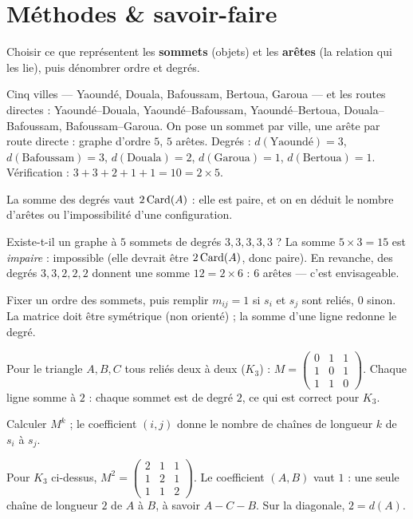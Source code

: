 \section{Méthodes \& savoir-faire}

Choisir ce que représentent les \textbf{sommets} (objets) et les \textbf{arêtes} (la relation
qui les lie), puis dénombrer ordre et degrés.
\begin{exemple}
Cinq villes — Yaoundé, Douala, Bafoussam, Bertoua, Garoua — et les routes directes :
Yaoundé–Douala, Yaoundé–Bafoussam, Yaoundé–Bertoua, Douala–Bafoussam, Bafoussam–Garoua.
On pose un sommet par ville, une arête par route directe : graphe d'ordre $5$, $5$ arêtes.
Degrés : $d(\text{Yaoundé})=3$, $d(\text{Bafoussam})=3$, $d(\text{Douala})=2$,
$d(\text{Garoua})=1$, $d(\text{Bertoua})=1$. Vérification : $3+3+2+1+1=10=2\times 5$.
\end{exemple}

La somme des degrés vaut $2\operatorname{Card}(A)$ : elle est paire, et on en déduit le nombre d'arêtes ou
l'impossibilité d'une configuration.
\begin{exemple}
Existe-t-il un graphe à $5$ sommets de degrés $3,3,3,3,3$ ? La somme $5\times3=15$ est
\emph{impaire} : impossible (elle devrait être $2\operatorname{Card}(A)$, donc paire). En revanche, des
degrés $3,3,2,2,2$ donnent une somme $12=2\times6$ : $6$ arêtes — c'est envisageable.
\end{exemple}

Fixer un ordre des sommets, puis remplir $m_{ij}=1$ si $s_i$ et $s_j$ sont reliés, $0$ sinon.
La matrice doit être symétrique (non orienté) ; la somme d'une ligne redonne le degré.
\begin{exemple}
Pour le triangle $A,B,C$ tous reliés deux à deux ($K_3$) :
$M=\begin{pmatrix}0&1&1\\1&0&1\\1&1&0\end{pmatrix}$. Chaque ligne somme à $2$ : chaque
sommet est de degré $2$, ce qui est correct pour $K_3$.
\end{exemple}

Calculer $M^k$ ; le coefficient $(i,j)$ donne le nombre de chaînes de longueur $k$ de $s_i$
à $s_j$.
\begin{exemple}
Pour $K_3$ ci-dessus, $M^2=\begin{pmatrix}2&1&1\\1&2&1\\1&1&2\end{pmatrix}$. Le coefficient
$(A,B)$ vaut $1$ : une seule chaîne de longueur $2$ de $A$ à $B$, à savoir $A-C-B$. Sur la
diagonale, $2=d(A)$.
\end{exemple}

